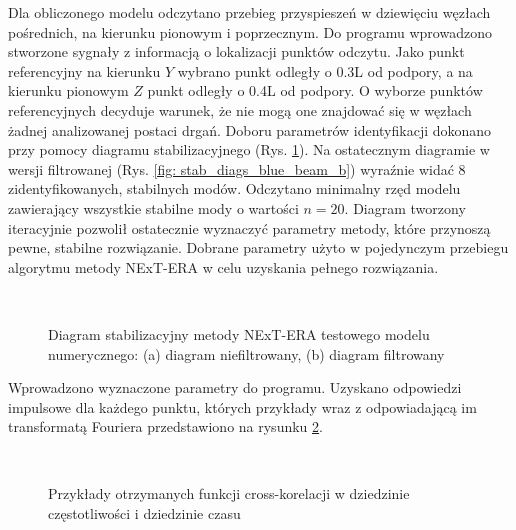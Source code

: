 Dla obliczonego modelu odczytano przebieg przyspieszeń w dziewięciu węzłach pośrednich, na kierunku pionowym i poprzecznym. Do programu wprowadzono stworzone sygnały z informacją o lokalizacji punktów odczytu. Jako punkt referencyjny na kierunku $Y$ wybrano punkt odległy o 0.3L od podpory, a na kierunku pionowym $Z$ punkt odległy o 0.4L od podpory. O wyborze punktów referencyjnych decyduje warunek, że nie mogą one znajdować się w węzłach żadnej analizowanej postaci drgań. Doboru parametrów identyfikacji dokonano przy pomocy diagramu stabilizacyjnego (Rys. \ref{fig: stab_diags_blue_beam}). Na ostatecznym diagramie w wersji filtrowanej (Rys. \ref{fig: stab_diags_blue_beam_b}) wyraźnie widać 8 zidentyfikowanych, stabilnych modów. Odczytano minimalny rzęd modelu zawierający wszystkie stabilne mody o wartości $n=20$. Diagram tworzony iteracyjnie pozwolił ostatecznie wyznaczyć parametry metody, które przynoszą pewne, stabilne rozwiązanie. Dobrane parametry użyto w pojedynczym przebiegu algorytmu metody NExT-ERA w celu uzyskania pełnego rozwiązania.

\begin{figure}[h]
	\centering
	\\
	
	\captionsetup{justification=centering}
	\caption{Diagram stabilizacyjny metody NExT-ERA testowego modelu numerycznego: (a) diagram niefiltrowany, (b) diagram filtrowany}
	\label{fig: stab_diags_blue_beam}
\end{figure}

Wprowadzono wyznaczone parametry do programu. Uzyskano odpowiedzi impulsowe dla każdego punktu, których przykłady wraz z odpowiadającą im transformatą Fouriera przedstawiono na rysunku \ref{fig: cross_corr_blue_beam}. 

\begin{figure}[h]
	\centering
	\\
	\captionsetup{justification=centering}
	\caption{Przykłady otrzymanych funkcji cross-korelacji w dziedzinie częstotliwości i dziedzinie czasu}
	\label{fig: cross_corr_blue_beam}
\end{figure}


